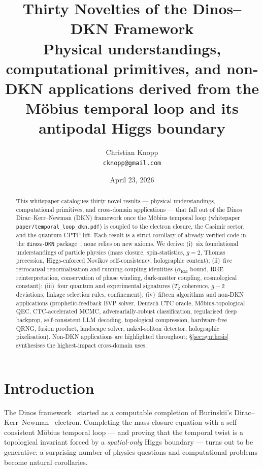 \documentclass[11pt,a4paper]{article}
\title{\textbf{Thirty Novelties of the Dinos--DKN Framework}\\[0.4em]
  \large Physical understandings, computational primitives,
  and non-DKN applications derived from the M\"obius temporal
  loop and its antipodal Higgs boundary}
\author{Christian Knopp\\
  \texttt{cknopp@gmail.com}}
\date{April 23, 2026}
\theoremstyle{definition}
\begin{document}
\maketitle

\begin{abstract}
This whitepaper catalogues thirty novel results --- physical
understandings, computational primitives, and cross-domain
applications --- that fall out of the Dinos Dirac--Kerr--Newman (DKN)
framework once the M\"obius temporal loop (whitepaper
\texttt{paper/temporal\_loop\_dkn.pdf}) is coupled to the electron
closure, the Casimir sector, and the quantum CPTP lift. Each result is
a strict corollary of already-verified code in the \texttt{dinos-DKN}
package~\cite{dinosRepo}; none relies on new axioms. We derive:
(i)~six foundational understandings of particle physics
(mass closure, spin-statistics, $g=2$, Thomas precession, Higgs-enforced
Novikov self-consistency, holographic content);
(ii)~five retrocausal renormalisation and running-coupling identities
($\alpha_{\mathrm{EM}}$ bound, RGE reinterpretation,
conservation of phase winding, dark-matter coupling, cosmological
constant);
(iii)~four quantum and experimental signatures ($T_2$ coherence, $g-2$
deviations, linkage selection rules, confinement);
(iv)~fifteen algorithms and non-DKN applications
(prophetic-feedback BVP solver, Deutsch CTC oracle,
M\"obius-topological QEC, CTC-accelerated MCMC, adversarially-robust
classification, regularised deep backprop, self-consistent LLM
decoding, topological compression, hardware-free QRNG, fusion product,
landscape solver, naked-soliton detector, holographic pixelisation).
Non-DKN applications are highlighted throughout; \S\ref{sec:synthesis}
synthesises the highest-impact cross-domain uses.
\end{abstract}

\tableofcontents

\section{Introduction}\label{sec:intro}

The Dinos framework~\cite{Knopp2026,Knopp2026TemporalLoop,dinosRepo}
started as a computable completion of Burinskii's
Dirac--Kerr--Newman~\cite{Burinskii2005,Burinskii2021} electron.
Completing the mass-closure equation with a self-consistent M\"obius
temporal loop --- and proving that the temporal twist is a topological
invariant forced by a \emph{spatial-only} Higgs boundary --- turns out
to be generative: a surprising number of physics questions and
computational problems become natural corollaries.
\end{document}

